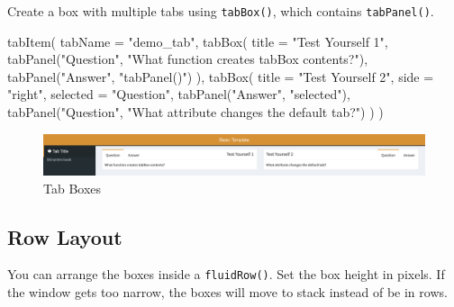 \documentclass[
  oneside]{book}
\newenvironment{Shaded}{\begin{snugshade}}{\end{snugshade}}
\newcommand{\AttributeTok}[1]{\textcolor[rgb]{0.77,0.63,0.00}{#1}}
\newcommand{\FunctionTok}[1]{\textcolor[rgb]{0.00,0.00,0.00}{#1}}
\newcommand{\NormalTok}[1]{#1}
\newcommand{\StringTok}[1]{\textcolor[rgb]{0.31,0.60,0.02}{#1}}
\begin{document}
Create a box with multiple tabs using \texttt{tabBox}\texttt{()}, which contains \texttt{tabPanel}\texttt{()}.

\begin{Shaded}
\begin{Highlighting}[]
\FunctionTok{tabItem}\NormalTok{(}
    \AttributeTok{tabName =} \StringTok{"demo\_tab"}\NormalTok{,}
    \FunctionTok{tabBox}\NormalTok{(}
        \AttributeTok{title =} \StringTok{"Test Yourself 1"}\NormalTok{,}
        \FunctionTok{tabPanel}\NormalTok{(}\StringTok{"Question"}\NormalTok{, }\StringTok{"What function creates tabBox contents?"}\NormalTok{),}
        \FunctionTok{tabPanel}\NormalTok{(}\StringTok{"Answer"}\NormalTok{, }\StringTok{"tabPanel()"}\NormalTok{)}
\NormalTok{    ),}
    \FunctionTok{tabBox}\NormalTok{(}
        \AttributeTok{title =} \StringTok{"Test Yourself 2"}\NormalTok{,}
        \AttributeTok{side =} \StringTok{"right"}\NormalTok{,}
        \AttributeTok{selected =} \StringTok{"Question"}\NormalTok{,}
        \FunctionTok{tabPanel}\NormalTok{(}\StringTok{"Answer"}\NormalTok{, }\StringTok{"selected"}\NormalTok{),}
        \FunctionTok{tabPanel}\NormalTok{(}\StringTok{"Question"}\NormalTok{, }\StringTok{"What attribute changes the default tab?"}\NormalTok{)}
\NormalTok{    )}
\NormalTok{)}
\end{Highlighting}
\end{Shaded}

\begin{figure}

{\centering \includegraphics[width=1\linewidth]{images/sdb_tab_box} 

}

\caption{Tab Boxes}\label{fig:sdb-tab-box}
\end{figure}

\hypertarget{row-layout}{%
\subsection{Row Layout}\label{row-layout}}

You can arrange the boxes inside a \texttt{fluidRow}\texttt{()}. Set the box height in pixels. If the window gets too narrow, the boxes will move to stack instead of be in rows.
\end{document}
